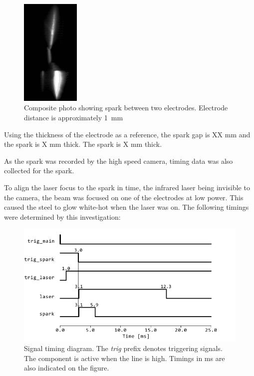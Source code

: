             \begin{figure}[!ht]
                \centering
                \includegraphics[width=0.25\textwidth]{assets/4 experiments/Composite photo spark.png}
                \caption{Composite photo showing spark between two electrodes. Electrode distance is approximately \qty{1}{mm}}
            \end{figure}
            
            Using the thickness of the electrode as a reference, the spark gap is XX mm and the spark is X mm thick. 
            The spark is  X mm thick.
            
            As the spark was recorded by the high speed camera, timing data was also collected for the spark.
            
            To align the laser focus to the spark in time, the infrared laser being invisible to the camera, the beam was focused on one of the electrodes at low power. This caused the steel to glow white-hot when the laser was on. The following timings were determined by this investigation: 

            \begin{figure}
                \centering
                \includegraphics[width=\textwidth]{assets/4 experiments/timings.pdf}
                \caption{Signal timing diagram. The \textit{trig} prefix denotes triggering signals. The component is active when the line is high. Timings in \unit{ms} are also indicated on the figure.}
            \end{figure}


